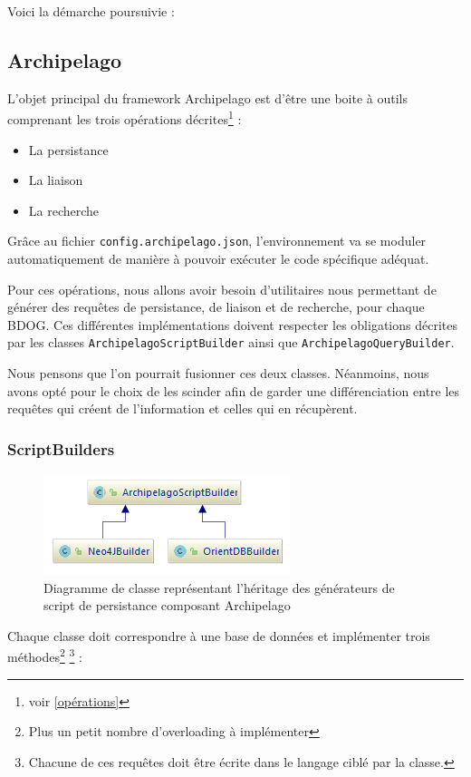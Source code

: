 \documentclass[a4paper,fleqn,12pt]{report}
\begin{document}
Voici la démarche poursuivie :

\subsection{Archipelago}

L'objet principal du framework Archipelago est d'être une boite à outils comprenant les trois opérations décrites\footnote{voir \ref{opérations}} :
\begin{itemize}
\item La persistance
\item La liaison
\item La recherche
\end{itemize}

Grâce au fichier \texttt{config.archipelago.json}, l'environnement va se moduler automatiquement de manière à pouvoir exécuter le code spécifique adéquat.

Pour ces opérations, nous allons avoir besoin d'utilitaires nous permettant de générer des requêtes de persistance, de liaison et de recherche, pour chaque BDOG. Ces différentes implémentations doivent respecter les obligations décrites par les classes \texttt{ArchipelagoScriptBuilder} ainsi que \texttt{ArchipelagoQueryBuilder}.

Nous pensons que l'on pourrait fusionner ces deux classes. Néanmoins, nous avons opté pour le choix de les scinder afin de garder une différenciation entre les requêtes qui créent de l'information et celles qui en récupèrent.


\subsubsection{ScriptBuilders}


\begin{figure}[!ht]
\centering
\includegraphics[scale=1.5]{figures/scriptBuilders.png}
\caption{Diagramme de classe représentant l'héritage des générateurs de script de persistance composant Archipelago}
\label{fig:ScriptQuery}
\end{figure}

Chaque classe doit correspondre à une base de données et implémenter trois méthodes\footnote{Plus un petit nombre d'overloading à implémenter} \footnote{Chacune de ces requêtes doit être écrite dans le langage ciblé par la classe.} :
\end{document}
